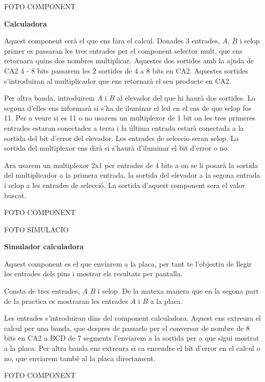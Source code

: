 \documentclass[12pt, a4papre]{article}
\begin{document}
	\begin{center}
		FOTO COMPONENT
	\end{center}
	
	\textbf{\large{Calculadora}}
	
	Aquest component serà el que ens fara el calcul. Donades 3 entrades, $A$, $B$ i selop primer es passaran les tres entrades per el component selector mult, que ens retornara quins dos nombres multiplicar. Aquestes dos sortides amb la ajuda de CA2 4 - 8 bits passarem les 2 sortides de 4 a 8 bits en CA2. Aquestes sortides s'introduiran al multiplicador que ens retornarà el seu producte en CA2. 
	
	Per altra banda, introduirem $A$ i $B$ al elevador del que hi haurà dos sortides. La segona d'elles ens informarà si s'ha de iluminar el led en el cas de que selop fos 11. Per a veure si es 11 o no usarem un multiplexor de 1 bit on les tres primeres entrades estaran conectades a terra i la última entrada estarà conectada a la sortida del bit d'error del elevador. Les entrades de seleccio seran selop. La sortida del multiplexor ens dirà si s'haurà d'iluminar el bit d'error o no.
	
	Ara usarem un multiplexor 2x1 per entrades de 4 bits a on se li posarà la sortida del multiplicador a la primera entrada, la sortida del elevador a la segona entrada i selop a les entrades de selecció. La sortida d'aquest component sera el valor buscat.
	
	\begin{center}
		FOTO COMPONENT
		
		FOTO SIMULACIO
	\end{center}
	
	\textbf{\large{Simulador calculadora}}
	
	Aquest component es el que enviarem a la placa, per tant te l'objectiu de llegir les entrades dels pins i mostrar els resultats per pantalla.
	
	Consta de tres entrades, $A$ $B$ i selop. De la matexa manera que en la segona part de la practica es mostraran les entrades $A$ i $B$ a la placa. 
	
	Les entrades s'introduiran dins del component calculadora. Aquest ens extreura el calcul per una banda, que despres de passarlo per el conversor de nombre de 8 bits en CA2 a BCD de 7 segments l'enviarem a la sortida per a que sigui mostrat a la placa. Per altra banda ens extreura si ca encendre el bit d'error en el calcul o no, que enviarem també al la placa directament.
	
	\begin{center}
		FOTO COMPONENT
	\end{center}
	
	
	
\end{document}
